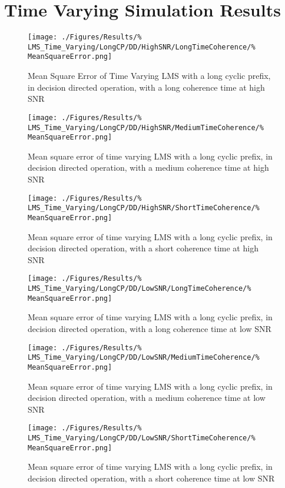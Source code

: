 \section{Time Varying Simulation Results}
\label{sec:TVResults}
\begin{figure}[ht]
	\texttt{[image: ./Figures/Results/\%
LMS\_Time\_Varying/LongCP/DD/HighSNR/LongTimeCoherence/\%
MeanSquareError.png]}
	\caption{Mean Square Error of Time Varying LMS with 
	a long cyclic prefix, in decision directed operation, with 
	a long coherence time at high SNR}
\end{figure}
\begin{figure}[ht]
	\texttt{[image: ./Figures/Results/\%
LMS\_Time\_Varying/LongCP/DD/HighSNR/MediumTimeCoherence/\%
MeanSquareError.png]}
	\caption{Mean square error of time varying LMS with a 
	long cyclic prefix, in decision directed operation, with a 
	medium coherence time at high SNR}
	\label{fig:Medium-High-Directed-Long}
\end{figure}
\begin{figure}[ht]
	\texttt{[image: ./Figures/Results/\%
LMS\_Time\_Varying/LongCP/DD/HighSNR/ShortTimeCoherence/\%
MeanSquareError.png]}
	\caption{Mean square error of time varying LMS with a 
	long cyclic prefix, in decision directed operation, with a 
	short coherence time at high SNR}
\end{figure}
\begin{figure}[ht]
	\texttt{[image: ./Figures/Results/\%
LMS\_Time\_Varying/LongCP/DD/LowSNR/LongTimeCoherence/\%
MeanSquareError.png]}
	\caption{Mean square error of time varying LMS with a 
	long cyclic prefix, in decision directed operation, with a 
	long coherence time at low SNR}
\end{figure}
\begin{figure}[ht]
	\texttt{[image: ./Figures/Results/\%
LMS\_Time\_Varying/LongCP/DD/LowSNR/MediumTimeCoherence/\%
MeanSquareError.png]}
	\caption{Mean square error of time varying LMS with a 
	long cyclic prefix, in decision directed operation, with a 
	medium coherence time at low SNR}
\end{figure}
\begin{figure}[ht]
	\texttt{[image: ./Figures/Results/\%
LMS\_Time\_Varying/LongCP/DD/LowSNR/ShortTimeCoherence/\%
MeanSquareError.png]}
	\caption{Mean square error of time varying LMS with a 
	long cyclic prefix, in decision directed operation, with a 
	short coherence time at low SNR}
\end{figure}

